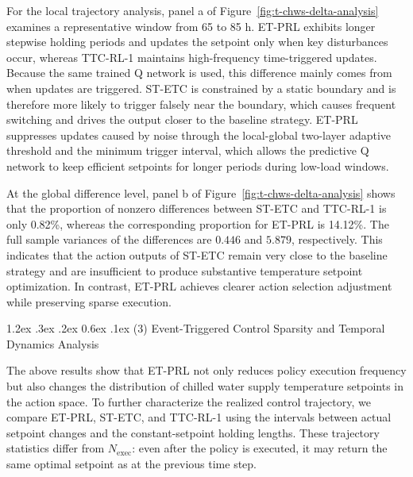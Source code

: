 \documentclass[preprint,12pt]{elsarticle}
\makeatletter
\renewcommand\paragraph{\@startsection{paragraph}{4}{\z@}%
  {1.2ex \@plus .3ex \@minus .2ex}%
  {0.6ex \@plus .1ex}%
  {\normalfont\normalsize}}
\makeatother
\begin{document}
For the local trajectory analysis, panel a of Figure~\ref{fig:t-chws-delta-analysis} examines a representative window from 65 to 85 h. ET-PRL exhibits longer stepwise holding periods and updates the setpoint only when key disturbances occur, whereas TTC-RL-1 maintains high-frequency time-triggered updates. Because the same trained Q network is used, this difference mainly comes from when updates are triggered. ST-ETC is constrained by a static boundary and is therefore more likely to trigger falsely near the boundary, which causes frequent switching and drives the output closer to the baseline strategy. ET-PRL suppresses updates caused by noise through the local-global two-layer adaptive threshold and the minimum trigger interval, which allows the predictive Q network to keep efficient setpoints for longer periods during low-load windows.

At the global difference level, panel b of Figure~\ref{fig:t-chws-delta-analysis} shows that the proportion of nonzero differences between ST-ETC and TTC-RL-1 is only 0.82\%, whereas the corresponding proportion for ET-PRL is 14.12\%. The full sample variances of the differences are \(0.446\) and \(5.879\), respectively. This indicates that the action outputs of ST-ETC remain very close to the baseline strategy and are insufficient to produce substantive temperature setpoint optimization. In contrast, ET-PRL achieves clearer action selection adjustment while preserving sparse execution.

\paragraph{(3) Event-Triggered Control Sparsity and Temporal Dynamics Analysis}\label{event-triggered-control-sparsity-and-temporal-dynamics-analysis}

The above results show that ET-PRL not only reduces policy execution frequency but also changes the distribution of chilled water supply temperature setpoints in the action space. To further characterize the realized control trajectory, we compare ET-PRL, ST-ETC, and TTC-RL-1 using the intervals between actual setpoint changes and the constant-setpoint holding lengths. These trajectory statistics differ from \(N_{\text{exec}}\): even after the policy is executed, it may return the same optimal setpoint as at the previous time step.
\end{document}
